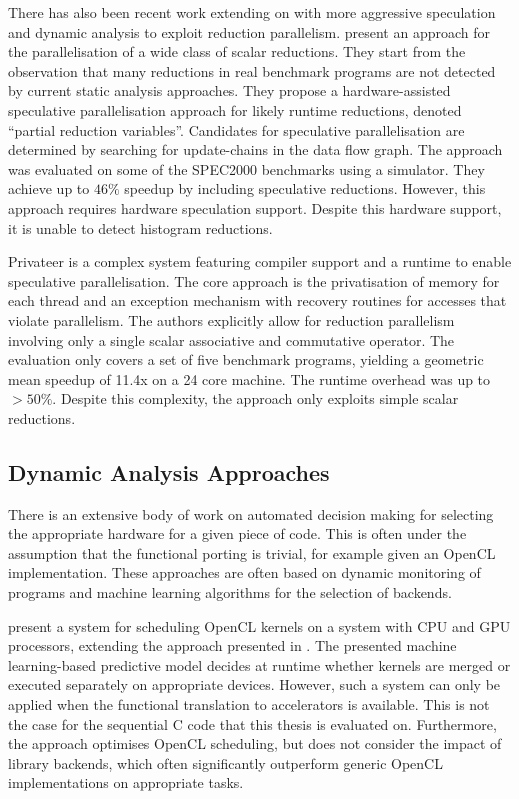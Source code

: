     There has also been recent work extending on \citet{rauchwerger1999lrpd}
    with more aggressive speculation and dynamic analysis
    \citep{aguilar2015unified} to exploit reduction parallelism.
    \citet{Han2010Speculative} present an approach for the
    parallelisation of a wide class of scalar reductions.
    They start from the observation that many reductions in real benchmark
    programs are not detected by current static analysis approaches.
    They propose a hardware-assisted speculative parallelisation approach for
    likely runtime reductions, denoted ``partial reduction variables''.
    Candidates for speculative parallelisation are determined by searching for
    update-chains in the data flow graph.
    The approach was evaluated on some of the SPEC2000 benchmarks using a
    simulator.
    They achieve up to $46\%$ speedup by including speculative reductions.
    However, this approach requires hardware speculation support.
    Despite this hardware support, it is unable to detect histogram reductions.

    Privateer \citep{Johnson:2012:SSP:2254064.2254107} is a complex system
    featuring compiler support and a runtime to enable speculative
    parallelisation.
    The core approach is the privatisation of memory for each thread and an
    exception mechanism with recovery routines for accesses that violate
    parallelism.
    The authors explicitly allow for reduction parallelism involving only a
    single scalar associative and commutative operator.
    The evaluation only covers a set of five benchmark programs, yielding
    a geometric mean speedup of 11.4x on a 24 core machine.
    The runtime overhead was up to $>50\%$.
    Despite this complexity, the approach only exploits simple scalar reductions.

\subsection{Dynamic Analysis Approaches}

    There is an extensive body of work on automated decision making for
    selecting the appropriate hardware for a given piece of code.
    This is often under the assumption that the functional porting is trivial,
    for example given an OpenCL implementation.
    These approaches are often based on dynamic monitoring of programs
    and machine learning algorithms for the selection of backends.

    \citet{Wen:2017:MSM:3038228.3038235} present a system for scheduling OpenCL
    kernels on a system with CPU and GPU processors, extending the approach
    presented in \citet{7116910}.
    The presented machine learning-based predictive model decides at runtime
    whether kernels are merged or executed separately on appropriate devices.
    However, such a system can only be applied when the functional translation
    to accelerators is available.
    This is not the case for the sequential C code that this thesis is evaluated
    on.
    Furthermore, the approach optimises OpenCL scheduling, but does not consider
    the impact of library backends, which often significantly outperform generic
    OpenCL implementations on appropriate tasks.

